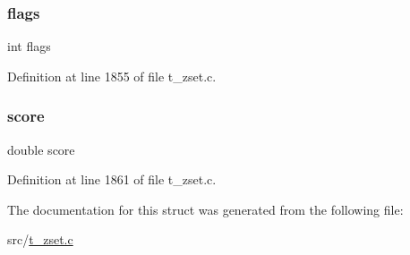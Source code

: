 \mbox{\label{structzsetopval_ac8bf36fe0577cba66bccda3a6f7e80a4}} 
\subsubsection{\texorpdfstring{flags}{flags}}
{\footnotesize\ttfamily int flags}



Definition at line 1855 of file t\+\_\+zset.\+c.

\mbox{\label{structzsetopval_a40a24ec85daa9ac70aa74e4ca744f838}} 
\subsubsection{\texorpdfstring{score}{score}}
{\footnotesize\ttfamily double score}



Definition at line 1861 of file t\+\_\+zset.\+c.



The documentation for this struct was generated from the following file\+:\begin{DoxyCompactItemize}
\item 
src/\hyperlink{t__zset_8c}{t\+\_\+zset.\+c}\end{DoxyCompactItemize}
